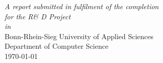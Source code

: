 \documentclass[11pt, oneside, table, xcdraw]{Thesis} %
\begin{document}
\begin{titlepage}
\begin{center}
\large \textit{A report submitted in fulfilment of the completion\\ for the
R\& D Project}\\[0.3cm] %
\textit{in}\\[0.4cm]
Bonn-Rhein-Sieg University of Applied Sciences\\Department of Computer Science\\[2cm] %
 
{\large \today}\\[4cm] %
 
\vfill
\end{center}
\end{titlepage}

\end{document}
